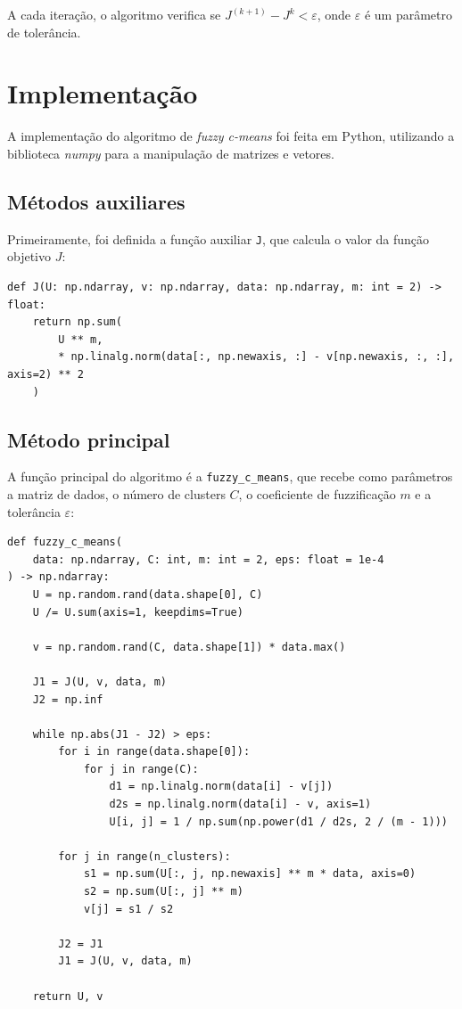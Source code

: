 \documentclass[a4paper, 11pt]{article}
\newcommand{\eps}{\varepsilon} %
\begin{document}
A cada iteração, o algoritmo verifica se $J^{(k + 1)} - J^k < \eps$, onde $\eps$ é um parâmetro de tolerância.

\section{Implementação}

A implementação do algoritmo de \textit{fuzzy c-means} foi feita em Python, utilizando a biblioteca \textit{numpy} para a manipulação de matrizes e vetores.

\subsection{Métodos auxiliares}

Primeiramente, foi definida a função auxiliar \texttt{J}, que calcula o valor da função objetivo $J$:

\begin{verbatim}
def J(U: np.ndarray, v: np.ndarray, data: np.ndarray, m: int = 2) -> float:
    return np.sum(
        U ** m,
        * np.linalg.norm(data[:, np.newaxis, :] - v[np.newaxis, :, :], axis=2) ** 2
    )
\end{verbatim}

\subsection{Método principal}

A função principal do algoritmo é a \texttt{fuzzy\_c\_means}, que recebe como parâmetros a matriz de dados, o número de clusters $C$, o coeficiente de fuzzificação $m$ e a tolerância $\eps$:

\begin{verbatim}
def fuzzy_c_means(
    data: np.ndarray, C: int, m: int = 2, eps: float = 1e-4
) -> np.ndarray:
    U = np.random.rand(data.shape[0], C)
    U /= U.sum(axis=1, keepdims=True)

    v = np.random.rand(C, data.shape[1]) * data.max()

    J1 = J(U, v, data, m)
    J2 = np.inf

    while np.abs(J1 - J2) > eps:
        for i in range(data.shape[0]):
            for j in range(C):
                d1 = np.linalg.norm(data[i] - v[j])
                d2s = np.linalg.norm(data[i] - v, axis=1)
                U[i, j] = 1 / np.sum(np.power(d1 / d2s, 2 / (m - 1)))

        for j in range(n_clusters):
            s1 = np.sum(U[:, j, np.newaxis] ** m * data, axis=0)
            s2 = np.sum(U[:, j] ** m)
            v[j] = s1 / s2

        J2 = J1
        J1 = J(U, v, data, m)

    return U, v
\end{verbatim}
\end{document}
